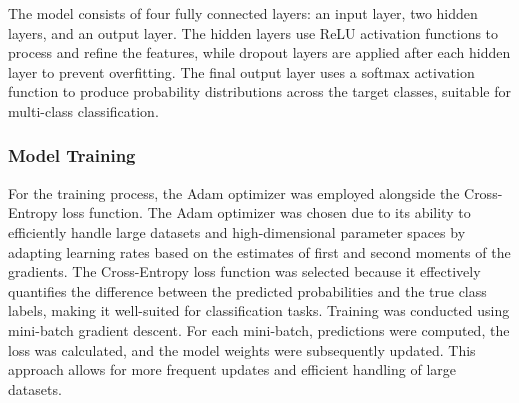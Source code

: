 \documentclass[10pt,twocolumn,letterpaper]{article}
\begin{document}
The model consists of four fully connected layers: an input layer, two hidden layers, and an output layer. The hidden layers use ReLU activation functions to process and refine the features, while dropout layers are applied after each hidden layer to prevent overfitting. The final output layer uses a softmax activation function to produce probability distributions across the target classes, suitable for multi-class classification.

\subsubsection{Model Training}

For the training process, the Adam optimizer was employed alongside the Cross-Entropy loss function. 
The Adam optimizer was chosen due to its ability to efficiently handle large datasets and high-dimensional parameter spaces by adapting learning rates based on the estimates of first and second moments of the gradients. 
The Cross-Entropy loss function was selected because it effectively quantifies the difference between the predicted probabilities and the true class labels, making it well-suited for classification tasks.
Training was conducted using mini-batch gradient descent. 
For each mini-batch, predictions were computed, the loss was calculated, and the model weights were subsequently updated. This approach allows for more frequent updates and efficient handling of large datasets.
\end{document}
